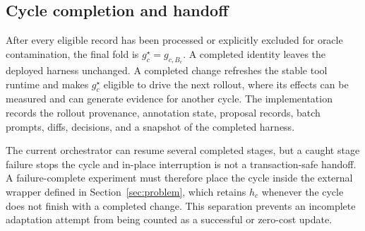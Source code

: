 \subsection{Cycle completion and handoff}

After every eligible record has been processed or explicitly excluded for oracle contamination, the final fold is $g_c^\star=g_{c,B_c}$. A completed identity leaves the deployed harness unchanged. A completed change refreshes the stable tool runtime and makes $g_c^\star$ eligible to drive the next rollout, where its effects can be measured and can generate evidence for another cycle. The implementation records the rollout provenance, annotation state, proposal records, batch prompts, diffs, decisions, and a snapshot of the completed harness.

The current orchestrator can resume several completed stages, but a caught stage failure stops the cycle and in-place interruption is not a transaction-safe handoff. A failure-complete experiment must therefore place the cycle inside the external wrapper defined in Section~\ref{sec:problem}, which retains $h_c$ whenever the cycle does not finish with a completed change. This separation prevents an incomplete adaptation attempt from being counted as a successful or zero-cost update.
